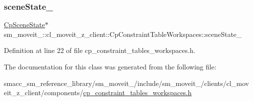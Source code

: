 \subsubsection{\texorpdfstring{scene\+State\+\_\+}{sceneState\_}}
{\footnotesize\ttfamily \hyperlink{classsm__moveit__4_1_1cl__perception__system_1_1CpSceneState}{Cp\+Scene\+State}$\ast$ sm\+\_\+moveit\+\_\+::cl\+\_\+moveit\+\_\+z\+\_\+client\+::\+Cp\+Constraint\+Table\+Workspaces\+::scene\+State\+\_\+\hspace{0.3cm}{\ttfamily [private]}}



Definition at line 22 of file cp\+\_\+constraint\+\_\+tables\+\_\+workspaces.\+h.



The documentation for this class was generated from the following file\+:\begin{DoxyCompactItemize}
\item 
smacc\+\_\+sm\+\_\+reference\+\_\+library/sm\+\_\+moveit\+\_/include/sm\+\_\+moveit\+\_/clients/cl\+\_\+moveit\+\_\+z\+\_\+client/components/\hyperlink{cp__constraint__tables__workspaces_8h}{cp\+\_\+constraint\+\_\+tables\+\_\+workspaces.\+h}\end{DoxyCompactItemize}
